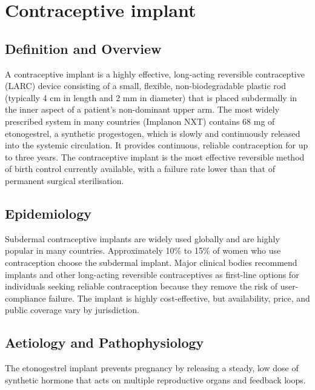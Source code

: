 \chapter{Contraceptive implant}

\section*{Definition and Overview}
A contraceptive implant is a highly effective, long-acting reversible contraceptive (LARC) device consisting of a small, flexible, non-biodegradable plastic rod (typically 4 cm in length and 2 mm in diameter) that is placed subdermally in the inner aspect of a patient's non-dominant upper arm. The most widely prescribed system in many countries (Implanon NXT) contains 68 mg of etonogestrel, a synthetic progestogen, which is slowly and continuously released into the systemic circulation. It provides continuous, reliable contraception for up to three years. The contraceptive implant is the most effective reversible method of birth control currently available, with a failure rate lower than that of permanent surgical sterilisation.

\section*{Epidemiology}
Subdermal contraceptive implants are widely used globally and are highly popular in many countries. Approximately 10\% to 15\% of women who use contraception choose the subdermal implant. Major clinical bodies recommend implants and other long-acting reversible contraceptives as first-line options for individuals seeking reliable contraception because they remove the risk of user-compliance failure. The implant is highly cost-effective, but availability, price, and public coverage vary by jurisdiction.

\section*{Aetiology and Pathophysiology}
The etonogestrel implant prevents pregnancy by releasing a steady, low dose of synthetic hormone that acts on multiple reproductive organs and feedback loops.

